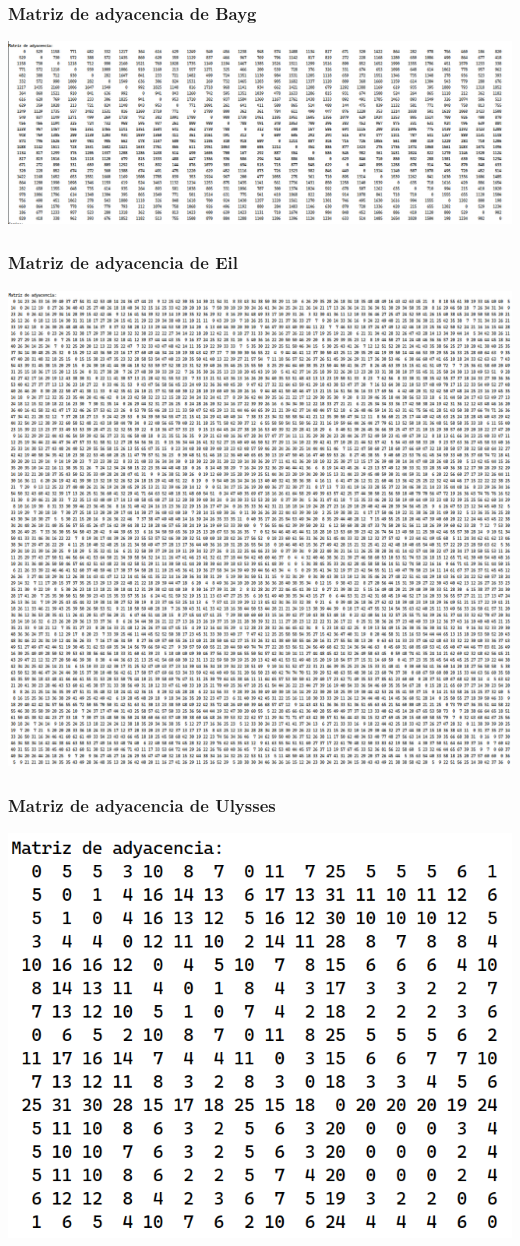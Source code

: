 \documentclass[13pt]{beamer}
\begin{document}
	\begin{frame}
		\frametitle{Matriz de adyacencia de Bayg}
		\includegraphics[scale=0.75]{img/ady-bayg.png}
	\end{frame}

	\begin{frame}
		\frametitle{Matriz de adyacencia de Eil}
		\includegraphics[scale=0.75]{img/ady-eil.png}
	\end{frame}

	\begin{frame}
		\frametitle{Matriz de adyacencia de Ulysses}
		\includegraphics[scale=0.68]{img/ady-ulysses.png}
	\end{frame}
	
\end{document}
